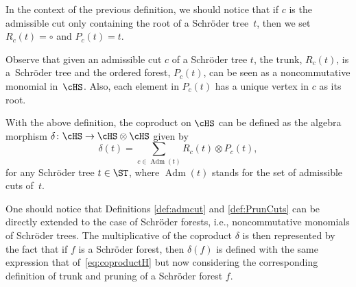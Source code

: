 \begin{Remark}In the context of the previous definition, we should notice that if $c$ is the admissible cut only containing the root of a Schr\"oder tree~$t$, then we set~$R_c(t) = \circ$ and $P_c(t) = t$.
\end{Remark}

\begin{Remark}Observe that given an admissible cut $c$ of a Schr\"oder tree $t$, the trunk, $R_c(t)$, is a~Schr\"oder tree and the ordered forest, $P_c(t)$, can be seen as a noncommutative monomial in~$\cHS$. Also, each element in $P_c(t)$ has a unique vertex in $c$ as its root.
\end{Remark}

With the above definition, the coproduct on $\cHS$ can be defined as the algebra morphism $\delta\colon \cHS\to \cHS\otimes \cHS$ given by
\begin{equation}\label{eq:coproductH}
	\delta(t) = \sum_{c \in \operatorname{Adm}(t)} R_c(t)\otimes P_c(t),
\end{equation}
for any Schr\"oder tree $t \in \ST$, where $\operatorname{Adm}(t)$ stands for the set of admissible cuts of~$t$.

\begin{Remark}
One should notice that Definitions \ref{def:admcut} and \ref{def:PrunCuts} can be directly extended to the case of Schr\"oder forests, i.e., noncommutative monomials of Schr\"oder trees. The multiplicative of the coproduct $\delta$ is then represented by the fact that if $f$ is a Schr\"oder forest, then $\delta(f)$ is defined with the same expression that of~\eqref{eq:coproductH} but now considering the corresponding definition of trunk and pruning of a Schr\"oder forest $f$.
\end{Remark}

